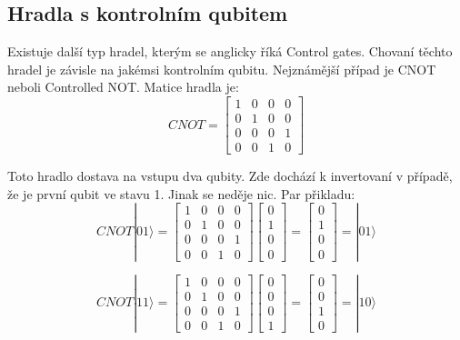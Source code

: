 \documentclass[11pt]{article}
\begin{document}
\subsection{Hradla s kontrolním qubitem}
Existuje další typ hradel, kterým se anglicky říká Control gates.
Chovaní těchto hradel je závisle na jakémsi kontrolním qubitu.
Nejznámější případ je CNOT neboli Controlled NOT. Matice hradla je:
$$CNOT = \begin{bmatrix}
        1 & 0 & 0 & 0 \\
        0 & 1 & 0 & 0 \\
        0 & 0 & 0 & 1 \\
        0 & 0 & 1 & 0
    \end{bmatrix}$$
\par Toto hradlo dostava na vstupu dva qubity.
Zde dochází k invertovaní v případě, že je první qubit ve stavu 1.
Jinak se neděje nic. Par přikladu:
$$CNOT|01\rangle = \begin{bmatrix}
        1 & 0 & 0 & 0 \\
        0 & 1 & 0 & 0 \\
        0 & 0 & 0 & 1 \\
        0 & 0 & 1 & 0
    \end{bmatrix}\begin{bmatrix}
        0 \\
        1 \\
        0 \\
        0
    \end{bmatrix} = \begin{bmatrix}
        0 \\
        1 \\
        0 \\
        0
    \end{bmatrix} = |01\rangle$$

$$CNOT|11\rangle = \begin{bmatrix}
        1 & 0 & 0 & 0 \\
        0 & 1 & 0 & 0 \\
        0 & 0 & 0 & 1 \\
        0 & 0 & 1 & 0
    \end{bmatrix}\begin{bmatrix}
        0 \\
        0 \\
        0 \\
        1
    \end{bmatrix} = \begin{bmatrix}
        0 \\
        0 \\
        1 \\
        0
    \end{bmatrix} = |10\rangle$$
\end{document}
